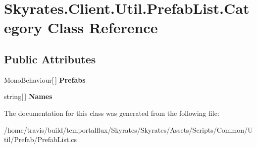 \hypertarget{class_skyrates_1_1_client_1_1_util_1_1_prefab_list_1_1_category}{\section{Skyrates.\-Client.\-Util.\-Prefab\-List.\-Category Class Reference}
\label{class_skyrates_1_1_client_1_1_util_1_1_prefab_list_1_1_category}
}
\subsection*{Public Attributes}
\begin{DoxyCompactItemize}
\item 
\hypertarget{class_skyrates_1_1_client_1_1_util_1_1_prefab_list_1_1_category_aa0ca69165015153b0dc7864bb2402c85}{Mono\-Behaviour\mbox{[}$\,$\mbox{]} {\bfseries Prefabs}}\label{class_skyrates_1_1_client_1_1_util_1_1_prefab_list_1_1_category_aa0ca69165015153b0dc7864bb2402c85}

\item 
\hypertarget{class_skyrates_1_1_client_1_1_util_1_1_prefab_list_1_1_category_a2701777df4216c8b4ab9a7e201be19d5}{string\mbox{[}$\,$\mbox{]} {\bfseries Names}}\label{class_skyrates_1_1_client_1_1_util_1_1_prefab_list_1_1_category_a2701777df4216c8b4ab9a7e201be19d5}

\end{DoxyCompactItemize}


The documentation for this class was generated from the following file\-:\begin{DoxyCompactItemize}
\item 
/home/travis/build/temportalflux/\-Skyrates/\-Skyrates/\-Assets/\-Scripts/\-Common/\-Util/\-Prefab/Prefab\-List.\-cs\end{DoxyCompactItemize}
